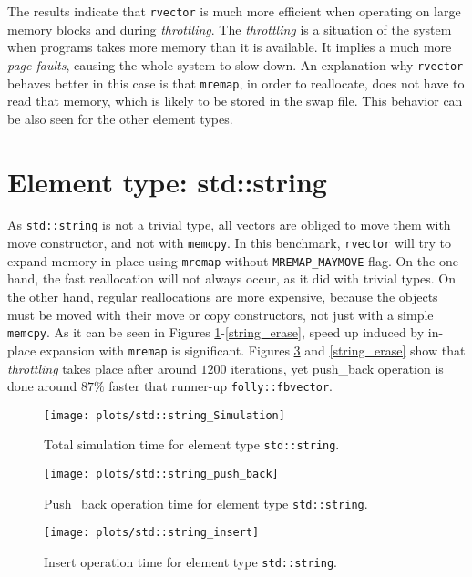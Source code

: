 \documentclass[inz, english, shortabstract]{iithesis}
\begin{document}
The results indicate that {\tt rvector} is much more efficient when operating on large memory blocks and during \emph{throttling}.
The \emph{throttling} is a situation of the system when programs takes more memory than it is available.
It implies a much more \emph{page faults}, causing the whole system to slow down.
An explanation why {\tt rvector} behaves better in this case is that {\tt mremap}, in order to reallocate, does not have to read that memory, which is likely to be stored in the swap file. 
This behavior can be also seen for the other element types.

\clearpage
\section{Element type: std::string}

As {\tt std::string} is not a trivial type, all vectors are obliged to move them with move constructor, and not with {\tt memcpy}. In this benchmark, {\tt rvector} will try to expand memory in place using {\tt mremap} without {\tt MREMAP\_MAYMOVE} flag.
On the one hand, the fast reallocation will not always occur, as it did with trivial types.
On the other hand, regular reallocations are more expensive, because the objects must be moved with their move or copy constructors, not just with a simple {\tt memcpy}.
As it can be seen in Figures \ref{string_simulation}-\ref{string_erase}, speed up induced by in-place expansion with {\tt mremap} is significant. Figures \ref{string_insert} and \ref{string_erase} show that \emph{throttling} takes place after around $1200$ iterations, yet push\_back operation is done around $87\%$ faster that runner-up {\tt folly::fbvector}.  

\begin{figure}[h!]
\texttt{[image: plots/std::string\_Simulation]}
\caption{Total simulation time for element type \lstinline{std::string}{}.}
\label{string_simulation}
\end{figure}

\begin{figure}[h!]
\texttt{[image: plots/std::string\_push\_back]}
\caption{Push\_back operation time for element type \lstinline{std::string}{}.}
\label{string_push_back}
\end{figure}

\begin{figure}[h!]
\texttt{[image: plots/std::string\_insert]}
\caption{Insert operation time for element type \lstinline{std::string}{}.}
\label{string_insert}
\end{figure}
\end{document}
